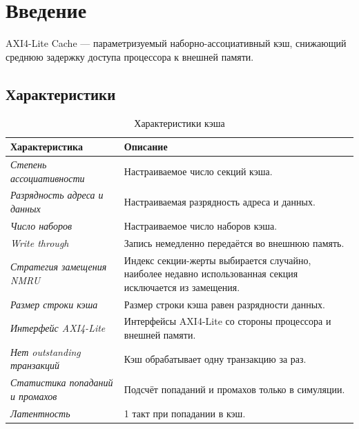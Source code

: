 \section{Введение}

AXI4-Lite Cache --- параметризуемый наборно-ассоциативный кэш, снижающий среднюю задержку доступа процессора к внешней памяти.

\subsection{Характеристики}

\begin{table}[htbp]
	\centering
	\label{tab}
	\small
	\begin{tabularx}{\textwidth}{l X}
		\toprule
		\textbf{Характеристика} & \textbf{Описание} \\
		\midrule
		
		\textit{Степень ассоциативности} &
		Настраиваемое число секций кэша. \\
		
		\textit{Разрядность адреса и данных} &
		Настраиваемая разрядность адреса и данных. \\
		
		\textit{Число наборов} &
		Настраиваемое число наборов кэша. \\
		
		\textit{Write through} &
		Запись немедленно передаётся во внешнюю память. \\
		
		\textit{Стратегия замещения NMRU} &
		Индекс секции-жерты выбирается случайно, наиболее недавно использованная секция исключается из замещения. \\
		
		\textit{Размер строки кэша} &
		Размер строки кэша равен разрядности данных. \\
		
		\textit{Интерфейс AXI4-Lite} &
		Интерфейсы AXI4-Lite со стороны процессора и внешней памяти. \\
		
		\textit{Нет outstanding транзакций} &
		Кэш обрабатывает одну транзакцию за раз. \\
		
		\textit{Статистика попаданий и промахов} &
		Подсчёт попаданий и промахов только в симуляции. \\

		\textit{Латентность} &
		1 такт при попадании в кэш. \\
		
		\bottomrule
	\end{tabularx}
	\caption{Характеристики кэша}
\end{table}

